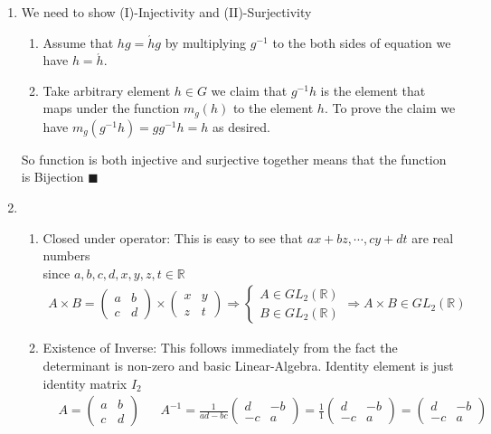 \documentclass{article}
\begin{document}
\begin{itemize}
\begin{enumerate}[label=(\alph*)]
		        \item We need to show (I)-Injectivity and (II)-Surjectivity
			  \begin{enumerate}[label=(\Roman*)]
				  \item  Assume that $hg = \acute{h}g$ by multiplying $g^{-1}$ to the both sides of equation we have $h=\acute{h}$.
				  \item Take arbitrary element $h\in G$ we claim that $g^{-1}h$ is the element that maps under the function $m_g(h)$ to
					  the element $h$. To prove the claim we have $m_g(g^{-1}h) = gg^{-1}h = h$ as desired.
			  \end{enumerate}
			  So function is both injective and surjective together means that the function is Bijection $\blacksquare$
			  \newpage

		        \item
			  \begin{enumerate}[label=(\Roman*)]
				  \item Closed under operator: This is easy to see that $ax+bz, \cdots , cy+dt$ are real numbers\\
					  since $a,b,c,d,x,y,z,t\in\mathbb{R}$
					\begin{align*}
						A \times  B = 
						\left(\begin{matrix} a & b \\ c & d \end{matrix}\right) \times 
						\left(\begin{matrix} x & y \\ z & t \end{matrix}\right) \Rightarrow
						\left\{\begin{array}{l}
						A\in GL_{2}(\mathbb{R})\\
						B\in GL_2(\mathbb{R})
					\end{array}\right.
					\Rightarrow A \times B \in GL_2(\mathbb{R})
					\end{align*}
				  \item 
				  	Existence of Inverse: This follows immediately from the fact the determinant is non-zero and basic Linear-Algebra.
					Identity element is just identity matrix $I_2$ 
					\begin{align*}
						&A = \left(\begin{matrix} a & b \\ c & d \end{matrix}\right)
						&&A^{-1} = \frac{1}{ad-bc}\left(\begin{matrix} d & -b \\ -c & a \end{matrix}\right)=
						\frac{1}{1} \left(\begin{matrix} d & -b \\ -c & a \end{matrix}\right)=
						\left(\begin{matrix} d & -b \\ -c & a \end{matrix}\right)
					\end{align*}


\end{enumerate}
\end{enumerate}
\end{itemize}
\end{document}
